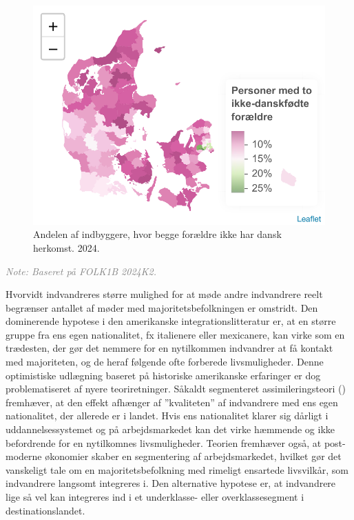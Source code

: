 \documentclass[
]{book}
\begin{document}
\newpage

\begin{figure}
\includegraphics[width=1\linewidth]{en-befolkning-blander-sig_files/figure-latex/fig-1-22-1} \caption{Andelen af indbyggere, hvor begge forældre ikke har dansk herkomst. 2024.}\label{fig:fig-1-22}
\end{figure}

\begin{footnotesize}\textit{\textcolor{gray}{
Note: Baseret på FOLK1B 2024K2.
}}
\end{footnotesize}

Hvorvidt indvandreres større mulighed for at møde andre indvandrere reelt begrænser antallet af møder med majoritetsbefolkningen er omstridt. Den dominerende hypotese i den amerikanske integrationslitteratur er, at en større gruppe fra ens egen nationalitet, fx italienere eller mexicanere, kan virke som en trædesten, der gør det nemmere for en nytilkommen indvandrer at få kontakt med majoriteten, og de heraf følgende ofte forberede livsmuligheder. Denne optimistiske udlægning baseret på historiske amerikanske erfaringer er dog problematiseret af nyere teoriretninger. Såkaldt segmenteret assimileringsteori () fremhæver, at den effekt afhænger af ''kvaliteten'' af indvandrere med ens egen nationalitet, der allerede er i landet. Hvis ens nationalitet klarer sig dårligt i uddannelsessystemet og på arbejdsmarkedet kan det virke hæmmende og ikke befordrende for en nytilkomnes livsmuligheder. Teorien fremhæver også, at post-moderne økonomier skaber en segmentering af arbejdsmarkedet, hvilket gør det vanskeligt tale om en majoritetsbefolkning med rimeligt ensartede livsvilkår, som indvandrere langsomt integreres i. Den alternative hypotese er, at indvandrere lige så vel kan integreres ind i et underklasse- eller overklassesegment i destinationslandet.
\end{document}
